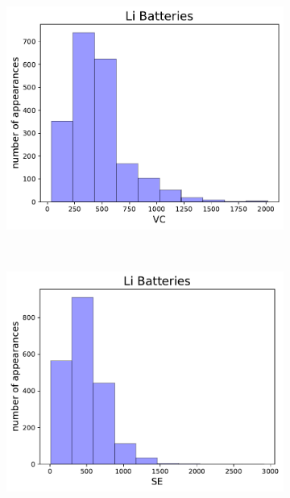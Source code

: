 \begin{figure}[h]
     \begin{subfigure}{0.3\textwidth}
         \centering
         \includegraphics[width=\linewidth]{result/figures/columnsplotLi_VC.pdf}
         \caption{}
     \end{subfigure}
          ~ 
     \begin{subfigure}{0.3\textwidth}
         \centering
         \includegraphics[width=\linewidth]{result/figures/columnsplotLi_SE.pdf}
         \caption{}
     \end{subfigure}
          ~ 
     \begin{subfigure}{0.3\textwidth}

\end{subfigure}
\end{figure}
